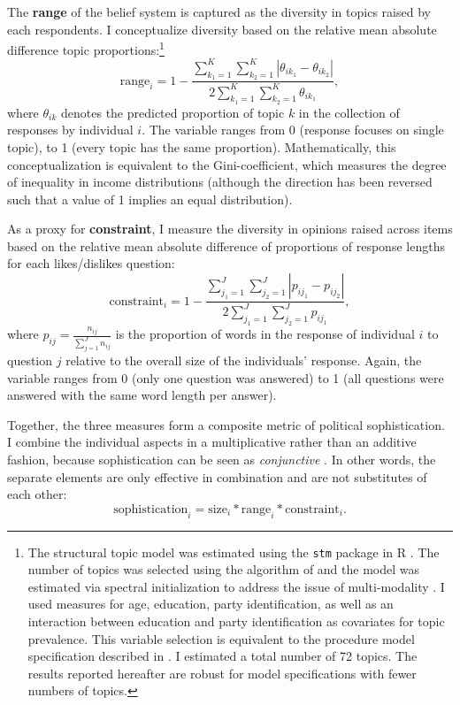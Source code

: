 \documentclass[12pt]{article}
\begin{document}
The \textbf{range} of the belief system is captured as the diversity in topics raised by each respondents. I conceptualize diversity based on the relative mean absolute difference topic proportions:\footnote{The structural topic model was estimated using the \texttt{stm} package in R \citep{roberts2014structural}. The number of topics was selected using the algorithm of \citet{lee2014low} and the model was estimated via spectral initialization to address the issue of multi-modality \citep[see][for details]{roberts2014stm}. I used measures for age, education, party identification, as well as an interaction between education and party identification as covariates for topic prevalence. This variable selection is equivalent to the procedure model specification described in \citet{roberts2014structural}. I estimated a total number of 72 topics. The results reported hereafter are robust for model specifications with fewer numbers of topics.}
\begin{equation}
\text{range}_i = 1-\dfrac{\sum_{k_1=1}^K\sum_{k_2=1}^K |\theta_{ik_1} - \theta_{ik_2}|}{2\sum_{k_1=1}^K\sum_{k_2=1}^K \theta_{ik_1}},
\end{equation}
where $\theta_{ik}$ denotes the predicted proportion of topic $k$ in the collection of responses by individual $i$. The variable ranges from 0 (response focuses on single topic), to 1 (every topic has the same proportion). Mathematically, this conceptualization is equivalent to the Gini-coefficient, which measures the degree of inequality in income distributions (although the direction has been reversed such that a value of 1 implies an equal distribution).

As a proxy for \textbf{constraint}, I measure the diversity in opinions raised across items based on the relative mean absolute difference of proportions of response lengths for each
likes/dislikes question:
\begin{equation}
\text{constraint}_i = 1-\dfrac{\sum_{j_1=1}^J\sum_{j_2=1}^J |p_{ij_1} - p_{ij_2}|}{2\sum_{j_1=1}^J\sum_{j_2=1}^J p_{ij_1}},
\end{equation}
where $p_{ij}=\tfrac{n_{ij}}{\sum_{j=1}^J n_{ij}}$ is the proportion of words in the response of individual $i$ to question $j$ relative to the overall size of the individuals' response. Again, the variable ranges from 0 (only one question was answered) to 1 (all questions were answered with the same word length per answer).

Together, the three measures form a composite metric of political sophistication. I combine the individual aspects in a multiplicative rather than an additive fashion, because sophistication can be seen as \textsl{conjunctive} \citep[see][]{luskin1987measuring}. In other words, the separate elements are only effective in combination and are not substitutes of each other:
\begin{equation}
\text{sophistication}_i = \text{size}_i * \text{range}_i * \text{constraint}_i.
\end{equation}
\end{document}
